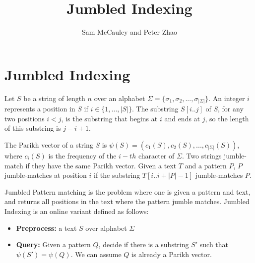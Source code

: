 \documentclass{article}
\title{Jumbled Indexing}
\author{Sam McCauley and Peter Zhao}
\date{}
\begin{document}
\maketitle

\section{Jumbled Indexing}
\label{sec:jumbledindexing}
Let $S$ be a string of length $n$ over an alphabet $\Sigma = \{\sigma_1, \sigma_2, ..., \sigma_{|\Sigma|}\}$. An integer $i$ represents a position in $S$ if $i \in \{1,...,|S|\}$. The substring $S[i..j]$ of $S$, for any two positions $i < j$, is the substring that begins at $i$ and ends at $j$, so the length of this substring is $j-i+1$. \cite{amir2014hardness}

The Parikh vector of a string $S$ is $\psi(S) = (c_1(S), c_2(S),...,c_{|\Sigma|}(S))$, where $c_i(S)$ is the frequency of the $i-th$ character of $\Sigma$. Two strings jumble-match if they have the same Parikh vector. Given a text $T$ and a pattern $P$, $P$ jumble-matches at position $i$ if the substring $T[i..i+|P|-1]$ jumble-matches $P$. 

Jumbled Pattern matching is the problem where one is given a pattern and text, and returns all positions in the text where the pattern jumble matches. Jumbled Indexing is an online variant defined as follows:
\begin{itemize}
    \item \textbf{Preprocess:} a text $S$ over alphabet $\Sigma$
    \item \textbf{Query:} Given a pattern $Q$, decide if there is a substring $S'$ such that $\psi(S') = \psi(Q)$. We can assume $Q$ is already a Parikh vector.
\end{itemize}
\end{document}

